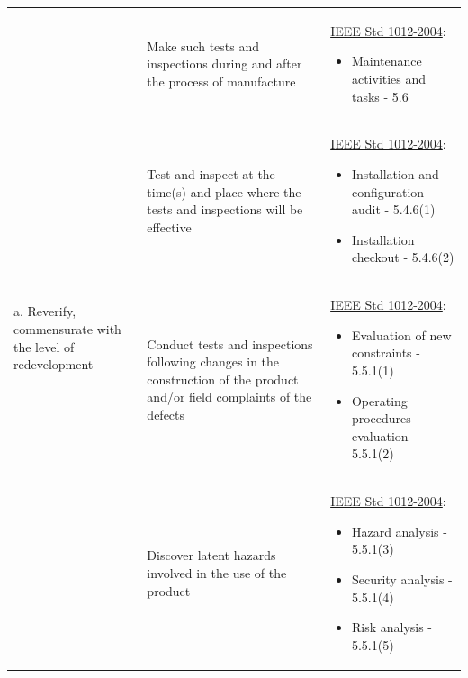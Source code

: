 \begin{longtable}{| p{2in} | p{2in} | p{2in} |}
\hline
\multirow{4}{2in}{a. Reverify, commensurate with the level of redevelopment} & Make such tests and inspections during and after the process of manufacture &
\underline{IEEE Std 1012-2004}:
\begin{small}\begin{itemize}
\item Maintenance activities and tasks - 5.6
\end{itemize}\end{small}\\
\cline{2-3}
 & Test and inspect at the time(s) and place where the tests and inspections
will be effective & \underline{IEEE Std 1012-2004}:
\begin{small}\begin{itemize}
\item Installation and configuration audit - 5.4.6(1)
\item Installation checkout - 5.4.6(2)
\end{itemize}\end{small}\\
\cline{2-3}
 & Conduct tests and inspections following changes in the construction of the
product and/or field complaints of the defects & \underline{IEEE Std 1012-2004}:
\begin{small}\begin{itemize}
\item Evaluation of new constraints - 5.5.1(1)
\item Operating procedures evaluation - 5.5.1(2)
\end{itemize}\end{small}\\
\cline{2-3}
 & Discover latent hazards involved in the use of the product & \underline{IEEE Std 1012-2004}:
\begin{small}\begin{itemize}
\item Hazard analysis - 5.5.1(3)
\item Security analysis - 5.5.1(4)
\item Risk analysis - 5.5.1(5)
\end{itemize}\end{small}\\
\hline
\end{longtable}
\doublespace


